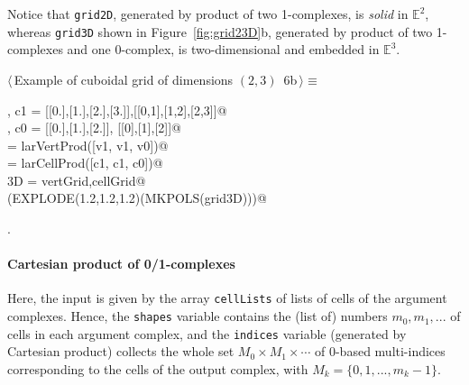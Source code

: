 \documentclass[11pt,oneside]{article}	%
\def\E{\mathbb{E}}
\begin{document}
Notice that \texttt{grid2D}, generated by product of two 1-complexes, is \emph{solid} in $\E^2$, whereas \texttt{grid3D} shown in Figure~\ref{fig:grid23D}b, generated by product of two 1-complexes and one 0-complex, is two-dimensional and embedded in $\E^3$.

\begin{flushleft} \small \label{scrap8}
\protect{}$\langle\,$Example of cuboidal grid of dimensions $(2,3)$\nobreak\ {\footnotesize 6b}$\,\rangle\equiv$
\vspace{-1ex}
\begin{list}{}{} \item
\mbox{}, c1 = [[0.],[1.],[2.],[3.]],[[0,1],[1,2],[2,3]]@\\
\mbox{}, c0 = [[0.],[1.],[2.]], [[0],[1],[2]]@\\
\mbox{}\verb@vertGrid = larVertProd([v1, v1, v0])@\\
\mbox{}\verb@cellGrid = larCellProd([c1, c1, c0])@\\
\mbox{}\verb@grid3D = vertGrid,cellGrid@\\
\mbox{}\verb@VIEW(EXPLODE(1.2,1.2,1.2)(MKPOLS(grid3D)))@\\
\mbox{}\verb@@{\NWsep}
\end{list}
\vspace{-1ex}
\footnotesize\addtolength{\baselineskip}{-1ex}
\begin{list}{}{\setlength{\itemsep}{-\parsep}\setlength{\itemindent}{-\leftmargin}}
\item {\NWtxtMacroNoRef}.
\end{list}
\end{flushleft}

\paragraph{Cartesian product of 0/1-complexes}
Here, the input is given by the array \texttt{cellLists} of lists of cells of the argument complexes. Hence, the \texttt{shapes} variable contains the (list of) numbers $m_0, m_1, ...$ of cells in each argument complex, and the \texttt{indices} variable (generated by Cartesian product) collects the whole set $M_0 \times M_1 \times \cdots$ of 0-based multi-indices corresponding to the cells of the output complex, with $M_k = \{0,1,...,m_{k}-1\}$.
\end{document}
